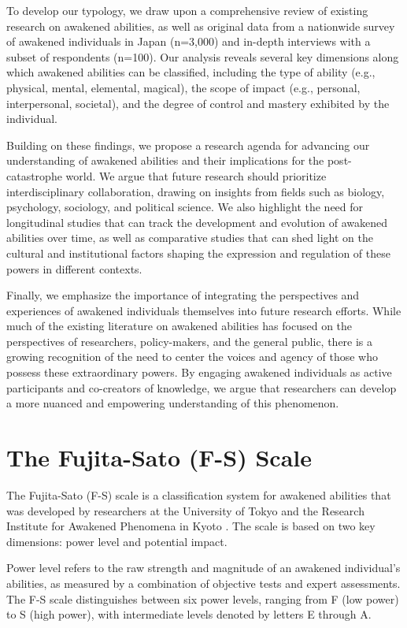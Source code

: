 \documentclass[12pt]{article}
\begin{document}
To develop our typology, we draw upon a comprehensive review of existing research on awakened abilities, as well as original data from a nationwide survey of awakened individuals in Japan (n=3,000) and in-depth interviews with a subset of respondents (n=100). Our analysis reveals several key dimensions along which awakened abilities can be classified, including the type of ability (e.g., physical, mental, elemental, magical), the scope of impact (e.g., personal, interpersonal, societal), and the degree of control and mastery exhibited by the individual.

Building on these findings, we propose a research agenda for advancing our understanding of awakened abilities and their implications for the post-catastrophe world. We argue that future research should prioritize interdisciplinary collaboration, drawing on insights from fields such as biology, psychology, sociology, and political science. We also highlight the need for longitudinal studies that can track the development and evolution of awakened abilities over time, as well as comparative studies that can shed light on the cultural and institutional factors shaping the expression and regulation of these powers in different contexts.

Finally, we emphasize the importance of integrating the perspectives and experiences of awakened individuals themselves into future research efforts. While much of the existing literature on awakened abilities has focused on the perspectives of researchers, policy-makers, and the general public, there is a growing recognition of the need to center the voices and agency of those who possess these extraordinary powers. By engaging awakened individuals as active participants and co-creators of knowledge, we argue that researchers can develop a more nuanced and empowering understanding of this phenomenon.

\section{The Fujita-Sato (F-S) Scale}
The Fujita-Sato (F-S) scale is a classification system for awakened abilities that was developed by researchers at the University of Tokyo and the Research Institute for Awakened Phenomena in Kyoto \cite{Fujita2026}. The scale is based on two key dimensions: power level and potential impact.

Power level refers to the raw strength and magnitude of an awakened individual's abilities, as measured by a combination of objective tests and expert assessments. The F-S scale distinguishes between six power levels, ranging from F (low power) to S (high power), with intermediate levels denoted by letters E through A.
\end{document}
